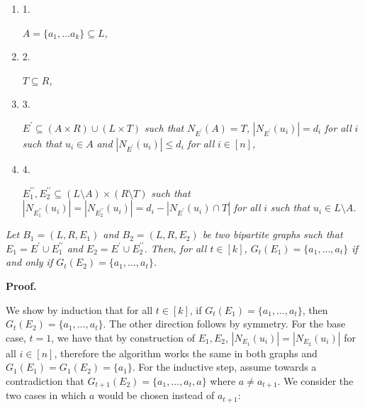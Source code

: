 \begin{enumerate}


\item[] 1. 


$A=\{a_{1},\ldots a_{k}\}\subseteq L$\emph{,}\par




\item[] 2. 


$T\subseteq R$\emph{,}\par




\item[] 3. 


$E^{\prime}\subseteq(A\times R)\cup(L\times T)$\emph{ such that }$N_{E^{\prime}}(A)=T$\emph{, }$|N_{E^{\prime}}(u_{i})|=d_{i}$\emph{ for all }$i$\emph{ such that }$u_{i}\in A$\emph{ and }$|N_{E^{\prime}}(u_{i})|\leq d_{i}$\emph{ for all }$i\in[n]$\emph{,}\par




\item[] 4. 


$E_{1}^{\prime\prime},E_{2}^{\prime\prime}\subseteq(L\setminus A)\times(R\setminus T)$\emph{ such that }$|N_{E^{\prime\prime}_{1}}(u_{i})|=|N_{E^{\prime\prime}_{2}}(u_{i})|=d_{i}-|N_{E^{\prime}}(u_{i})\cap T|$\emph{ for all }$i$\emph{ such that }$u_{i}\in L\setminus A$\emph{.}\par




\end{enumerate}


\emph{Let $B_{1}=(L,R,E_{1})$ and $B_{2}=(L,R,E_{2})$ be two bipartite graphs such that
$E_{1}=E^{\prime}\cup E^{\prime\prime}_{1}$ and $E_{2}=E^{\prime}\cup E^{\prime\prime}_{2}$.
Then, for all $t\in[k]$, $G_{t}(E_{1})=\{a_{1},\ldots,a_{t}\}$ if and only if $G_{t}(E_{2})=\{a_{1},\ldots,a_{t}\}$.}\par






\par\medskip\noindent\textbf{Proof.}\par



We show by induction that for all $t\in[k]$, if $G_{t}(E_{1})=\{a_{1},\dots,a_{t}\}$, then $G_{t}(E_{2})=\{a_{1},\dots,a_{t}\}$. The other direction follows by symmetry.
For the base case, $t=1$, we have that by construction of $E_{1},E_{2}$, $|N_{E_{1}}(u_{i})|=|N_{E_{2}}(u_{i})|$ for all $i\in[n]$, therefore the algorithm works the same in both graphs and $G_{1}(E_{1})=G_{1}(E_{2})=\{a_{1}\}$.
For the inductive step, assume towards a contradiction that $G_{t+1}(E_{2})=\{a_{1},\dots,a_{t},a\}$ where $a\neq a_{t+1}$.
We consider the two cases in which $a$ would be chosen instead of $a_{t+1}$:\par


